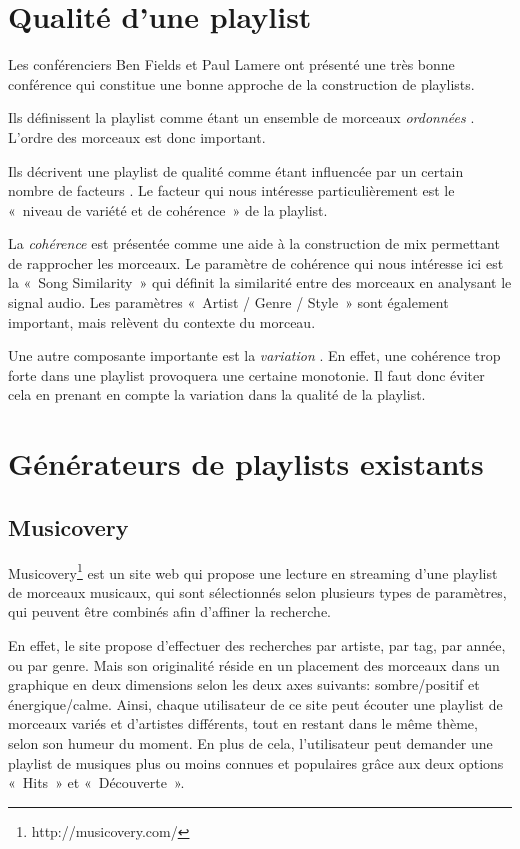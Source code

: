 
\section{Qualité d'une playlist}
\label{existant:qualite}

Les conférenciers Ben Fields et Paul Lamere ont présenté une très bonne
conférence \cite{ismir2010:playlist-tutorial} qui constitue une bonne approche
de la construction de playlists.

Ils définissent la playlist comme étant un ensemble de morceaux \emph{ordonnées}
\cite[p.~7]{ismir2010:playlist-tutorial}. L'ordre des morceaux est donc
important.

Ils décrivent une playlist de qualité comme étant influencée par un certain
nombre de facteurs \cite[p.~17--18]{ismir2010:playlist-tutorial}. Le facteur qui
nous intéresse particulièrement est le «~niveau de variété et de cohérence~» de
la playlist.

La \emph{cohérence} est présentée \cite[p.~21 -- 23]{ismir2010:playlist-tutorial}
comme une aide à la construction de mix permettant de rapprocher les morceaux.
Le paramètre de cohérence qui nous intéresse ici est la «~Song Similarity~» qui
définit la similarité entre des morceaux en analysant le signal audio.
Les paramètres «~Artist / Genre / Style~» sont également important, mais 
relèvent du contexte du morceau.

Une autre composante importante est la \emph{variation} 
\cite[p.~32]{ismir2010:playlist-tutorial}. En effet, une cohérence trop forte
dans une playlist provoquera une certaine monotonie. Il faut donc éviter cela
en prenant en compte la variation dans la qualité de la playlist.

\section{Générateurs de playlists existants}
\label{existant:generateurs}

\subsection{Musicovery}
\label{existant:generateurs:musicovery}

Musicovery\footnote{http://musicovery.com/} est un site web qui propose une 
lecture en streaming d'une playlist de morceaux musicaux, qui sont sélectionnés 
selon plusieurs types de paramètres, qui peuvent être combinés afin d'affiner 
la recherche.

En effet, le site propose d'effectuer des recherches par artiste, par tag, 
par année, ou par genre. Mais son originalité réside en un placement des 
morceaux dans un graphique en deux dimensions selon les deux axes suivants:
sombre/positif et énergique/calme.
Ainsi, chaque utilisateur de ce site peut écouter une playlist de morceaux 
variés et d'artistes différents, tout en restant dans le même thème, selon 
son humeur du moment.
En plus de cela, l'utilisateur peut demander une playlist de musiques plus 
ou moins connues et populaires grâce aux deux options «~Hits~» et «~Découverte~».

